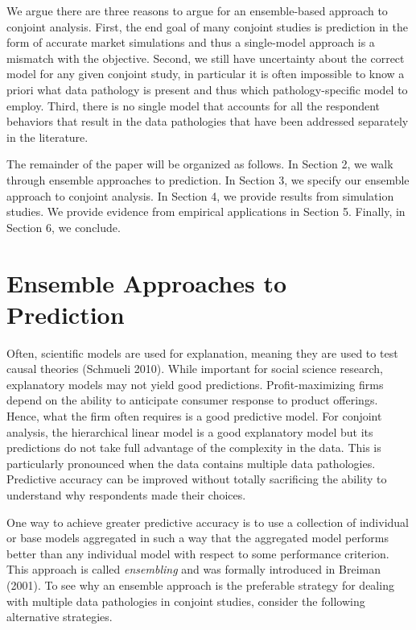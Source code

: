 \documentclass[12pt,titlepage]{mktg-article}
\begin{document}
We argue there are three reasons to argue for an ensemble-based approach to conjoint analysis. First, the end goal of many conjoint studies is prediction in the form of accurate market simulations and thus a single-model approach is a mismatch with the objective. Second, we still have uncertainty about the correct model for any given conjoint study, in particular it is often impossible to know a priori what data pathology is present and thus which pathology-specific model to employ. Third, there is no single model that accounts for all the respondent behaviors that result in the data pathologies that have been addressed separately in the literature.

The remainder of the paper will be organized as follows. In Section 2, we walk through ensemble approaches to prediction. In Section 3, we specify our ensemble approach to conjoint analysis. In Section 4, we provide results from simulation studies. We provide evidence from empirical applications in Section 5. Finally, in Section 6, we conclude.

\hypertarget{ensemble-approaches-to-prediction}{%
\section{Ensemble Approaches to Prediction}\label{ensemble-approaches-to-prediction}}

Often, scientific models are used for explanation, meaning they are used to test causal theories (Schmueli 2010). While important for social science research, explanatory models may not yield good predictions. Profit-maximizing firms depend on the ability to anticipate consumer response to product offerings. Hence, what the firm often requires is a good predictive model. For conjoint analysis, the hierarchical linear model is a good explanatory model but its predictions do not take full advantage of the complexity in the data. This is particularly pronounced when the data contains multiple data pathologies. Predictive accuracy can be improved without totally sacrificing the ability to understand why respondents made their choices.

One way to achieve greater predictive accuracy is to use a collection of individual or base models aggregated in such a way that the aggregated model performs better than any individual model with respect to some performance criterion. This approach is called \emph{ensembling} and was formally introduced in Breiman (2001). To see why an ensemble approach is the preferable strategy for dealing with multiple data pathologies in conjoint studies, consider the following alternative strategies.
\end{document}
